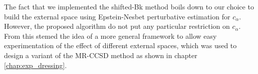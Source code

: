 \documentclass[./thesis.tex]{subfiles}
\begin{document}
The fact that we implemented the shifted-Bk method boils down to our choice to build the external space using Epstein-Nesbet perturbative estimation for $c_\alpha$. However, the proposed algorithm do not put any particular restriction on $c_\alpha$. From this stemed the idea of a more general framework to allow easy experimentation of the effect of different external spaces, which was used to design a \alert{variant} of the MR-CCSD method as shown in chapter \ref{chap:exp_dressing}.
\end{document}
